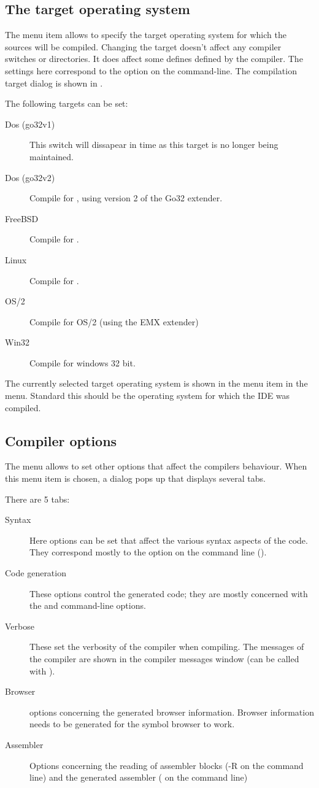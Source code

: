 \subsection{The target operating system}
The menu item  allows to specify the target
operating system for which the sources will be compiled.
Changing the target doesn't affect any compiler switches or
directories. It does affect some defines defined by the compiler.
The settings here correspond to the option 
on the command-line. The compilation target dialog is shown in .


The following targets can be set:
\begin{description}
\item[Dos (go32v1)] This switch will dissapear in time as this target is no
longer being maintained.
\item[Dos (go32v2)] Compile for \dos, using version 2 of the Go32 extender.
\item[FreeBSD] Compile for \freebsd.
\item[Linux] Compile for \linux.
\item[OS/2] Compile for OS/2 (using the EMX extender)
\item[Win32] Compile for windows 32 bit.
\end{description}
The currently selected target operating system is shown in the menu item in
the  menu. Standard this should be the operating system for
which the IDE was compiled.
%
%
\subsection{Compiler options}
The menu  allows to set other options that affect the
compilers behaviour. When this menu item is chosen, a dialog pops up that
displays several tabs.

There are 5 tabs:
\begin{description}
\item[Syntax] Here options can be set that affect the various syntax aspects
of the code. They correspond mostly to the  option on the command
line ().
\item[Code generation] These options control the generated code; they are
mostly concerned with the  and  command-line options.
\item[Verbose] These set the verbosity of the compiler when compiling. The
messages of the compiler are shown in the compiler messages window (can be
called with ).
\item[Browser] options concerning the generated browser information. Browser
information needs to be generated for the symbol browser to work.
\item[Assembler] Options concerning the reading of assembler blocks (-R on
the command line) and the generated assembler ( on the command line)
\end{description}

